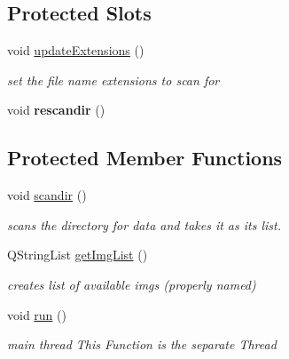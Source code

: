 \subsection*{Protected Slots}
\begin{CompactItemize}
\item 
\hypertarget{class_input_list_thread_135b839a5a4660b1cce9c6899640a8cb}{
void \hyperlink{class_input_list_thread_135b839a5a4660b1cce9c6899640a8cb}{updateExtensions} ()}
\label{class_input_list_thread_135b839a5a4660b1cce9c6899640a8cb}

\begin{CompactList}\small\item\em set the file name extensions to scan for \item\end{CompactList}\item 
\hypertarget{class_input_list_thread_64bea926524e1adb1a5df1a9dbab0ab4}{
void \textbf{rescandir} ()}
\label{class_input_list_thread_64bea926524e1adb1a5df1a9dbab0ab4}

\end{CompactItemize}
\subsection*{Protected Member Functions}
\begin{CompactItemize}
\item 
\hypertarget{class_input_list_thread_3dfde19032c056b17ce4c083826ee4ed}{
void \hyperlink{class_input_list_thread_3dfde19032c056b17ce4c083826ee4ed}{scandir} ()}
\label{class_input_list_thread_3dfde19032c056b17ce4c083826ee4ed}

\begin{CompactList}\small\item\em scans the directory for data and takes it as its list. \item\end{CompactList}\item 
\hypertarget{class_input_list_thread_84f9bec62b5e04bc31ab2318f0ed4999}{
QStringList \hyperlink{class_input_list_thread_84f9bec62b5e04bc31ab2318f0ed4999}{getImgList} ()}
\label{class_input_list_thread_84f9bec62b5e04bc31ab2318f0ed4999}

\begin{CompactList}\small\item\em creates list of available imgs (properly named) \item\end{CompactList}\item 
\hypertarget{class_input_list_thread_69824a70efa3507388e1f6d5ffc69777}{
void \hyperlink{class_input_list_thread_69824a70efa3507388e1f6d5ffc69777}{run} ()}
\label{class_input_list_thread_69824a70efa3507388e1f6d5ffc69777}

\begin{CompactList}\small\item\em main thread This Function is the separate Thread \item\end{CompactList}\end{CompactItemize}
